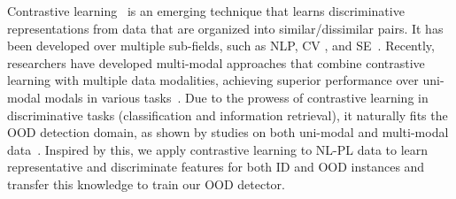 Contrastive learning~\cite{1640964} is an emerging technique that learns discriminative representations from data that are organized into similar/dissimilar pairs. It has been developed over multiple sub-fields, such as NLP, CV \cite{khosla2020supervised, chen2020simple}, and SE~\cite{jain2020contrastive, guo2022unixcoder}. Recently, researchers have developed multi-modal approaches that combine contrastive learning with multiple data modalities, achieving superior performance over uni-modal modals in various tasks~\cite{radford2021learning, liu2023contrabert}. Due to the prowess of contrastive learning in discriminative tasks (\eg classification and information retrieval), it naturally fits the OOD detection domain, as shown by studies on both uni-modal and multi-modal data~\cite{ming2022delving, qiu2022unsupervised, esmaeilpour2022zero}. Inspired by this, we apply contrastive learning to NL-PL data to learn representative and discriminate features for both ID and OOD instances and transfer this knowledge to train our OOD detector.







